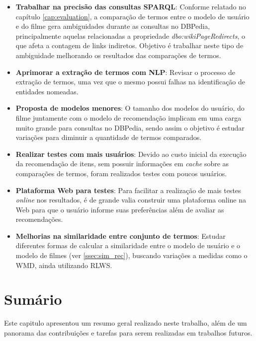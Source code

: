 \begin{itemize}
	\item{\textbf{Trabalhar na precisão das consultas \ac{SPARQL}}: Conforme relatado no capítulo \ref{cap:evaluation}, a comparação de termos entre o modelo de usuário e do filme gera ambiguidades durante as consultas no DBPedia, principalmente aquelas relacionadas a propriedade \textit{dbo:wikiPageRedirects},  o que afeta a contagem de links indiretos. Objetivo é trabalhar neste tipo de ambiguidade melhorando os resultados das comparações de termos.}
	
	\item{\textbf{Aprimorar a extração de termos com \ac{NLP}}: Revisar o processo de extração de termos, uma vez que o mesmo possui falhas na identificação de entidades nomeadas.}
	
	\item{\textbf{Proposta de modelos menores}: O tamanho dos modelos do usuário, do filme juntamente com o modelo de recomendação implicam em uma carga muito grande para consultas no DBPedia, sendo assim o objetivo é estudar variações para diminuir a quantidade de termos comparados.}
	
	\item{\textbf{Realizar testes com mais usuários}: Devido ao custo inicial da execução da recomendação de itens, sem possuir informações em \textit{cache} sobre as comparações de termos, foram realizados testes com poucos usuários.}

	\item{\textbf{Plataforma Web para testes}: Para facilitar a realização de mais testes \textit{online} nos resultados, é de grande valia construir uma plataforma online na Web para que o usuário informe suas preferências além de avaliar as recomendações.}
	
	\item{\textbf{Melhorias na similaridade entre conjunto de termos}: Estudar diferentes formas de calcular a similaridade entre o modelo de usuário e o modelo de filmes (ver \ref{ssec:sim_rec}), buscando variações a medidas como o \ac{WMD}, ainda utilizando \ac{RLWS}.}
\end{itemize}

\section{Sumário}

Este capitulo apresentou um resumo geral realizado neste trabalho, além de um panorama das contribuições  e tarefas para serem realizadas em trabalhos futuros.